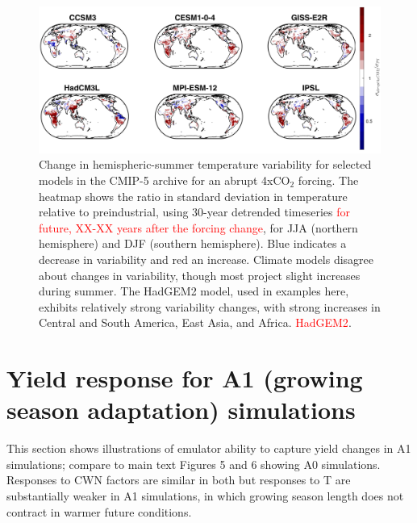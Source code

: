 \documentclass[12pt]{article}
\begin{document}
\begin{figure}[h!]
  \centering
  \includegraphics[width = 16.3cm]{tas_Amon_LRM6_abrupt4x_control_LF_maps_JJA_final.png}
  \caption{
	  Change in hemispheric-summer temperature variability for selected models in the CMIP-5 archive for an abrupt 4xCO$_2$ forcing. The heatmap shows the ratio in standard deviation in temperature  relative to preindustrial, using 30-year detrended timeseries \textcolor{red}{for future, XX-XX years after the forcing change}, for JJA (northern hemisphere) and DJF (southern hemisphere).  %
    Blue indicates a decrease in variability and red an increase.
   Climate models disagree about changes in variability, though most project slight increases during summer. The HadGEM2 model, used in examples here, exhibits relatively strong variability changes, with strong increases in Central and South America, East Asia, and Africa. 
	\textcolor{red}{HadGEM2}.
  }
  \label{fig:var}
\end{figure}



\clearpage
\section{Yield response for A1 (growing season adaptation) simulations}
\begin{flushleft}
	This section shows illustrations of emulator ability to capture yield changes in A1 simulations; compare to main text Figures 5 and 6 showing A0 simulations. Responses to CWN factors are similar in both but responses to T are substantially weaker in A1 simulations, in which growing season length does not contract in warmer future conditions.
\end{flushleft}
\end{document}

